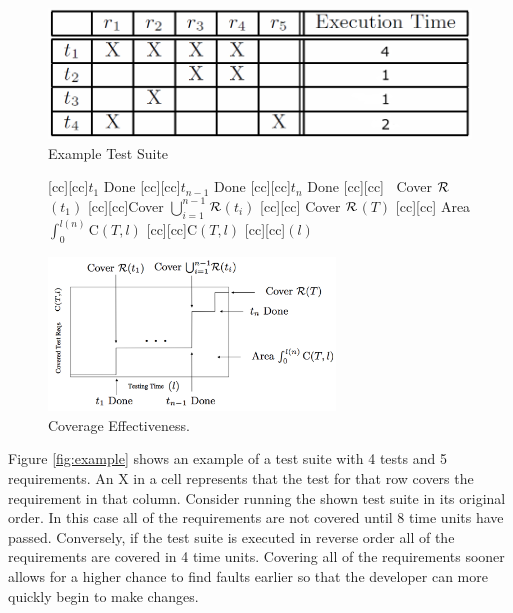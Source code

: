 \documentclass{vgtc}                          %
\begin{document}
\begin{figure}[t]
\centering
\includegraphics[scale=.2]{CoverageMatrix.png}
\caption{Example Test Suite}
\end{figure}
\label{fig:example}

\begin{figure}[t]
\centering

[cc][cc]{$t_1$ Done}
[cc][cc]{$t_{n-1}$ Done}
[cc][cc]{$t_{n}$ Done}
[cc][cc]{$\;\;$ Cover $\cal{R}$$(t_1)$}
[cc][cc]{Cover $\bigcup_{i = 1}^{n-1}$$ \cal{R}$$(t_i)$}
[cc][cc]{\hspace{10pt} Cover $\cal{R}$$(T)$}
[cc][cc]{\hspace{10pt} Area $\int_0^{l(n)} \mathrm{C}(T, l)$}
[cc][cc]{${\scriptstyle \mathrm{C}(T,l)}$}
[cc][cc]{$(l)$}

\includegraphics[width=3in]{cum_cov_final.png}
\vspace{.05in}
\caption{Coverage Effectiveness.} %
\vspace{-.2in}
\label{fig:ce}
\end{figure}	


Figure \ref{fig:example} shows an example of a test suite with 4 tests and 5 requirements.  An X in a cell represents that the test for that row covers the requirement in that column.  Consider running the shown test suite in its original order.  In this case all of the requirements are not covered until 8 time units have passed.  Conversely, if the test suite is executed in reverse order all of the requirements are covered in 4 time units.  Covering all of the requirements sooner allows for a higher chance to find faults earlier so that the developer can more quickly begin to make changes.
\end{document}
